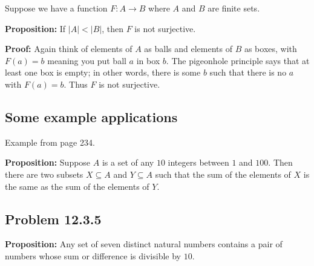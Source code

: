 \documentclass[
]{article}
\begin{document}
Suppose we have a function \(F:A\to B\) where \(A\) and \(B\) are finite
sets.

\textbf{Proposition:} If \(|A|<|B|\), then \(F\) is not surjective.

\textbf{Proof:} Again think of elements of \(A\) as balls and elements
of \(B\) as boxes, with \(F(a)=b\) meaning you put ball \(a\) in box
\(b\). The pigeonhole principle says that at least one box is empty; in
other words, there is some \(b\) such that there is no \(a\) with
\(F(a)=b\). Thus \(F\) is not surjective.

\vfill\eject

\hypertarget{some-example-applications}{%
\subsection{Some example applications}\label{some-example-applications}}

Example from page 234.

\textbf{Proposition:} Suppose \(A\) is a set of any \(10\) integers
between \(1\) and \(100\). Then there are two subsets \(X\subseteq A\)
and \(Y\subseteq A\) such that the sum of the elements of \(X\) is the
same as the sum of the elements of \(Y\).

\vfill\eject

\hypertarget{problem-12.3.5}{%
\subsection{Problem 12.3.5}\label{problem-12.3.5}}

\textbf{Proposition:} Any set of seven distinct natural numbers contains
a pair of numbers whose sum or difference is divisible by \(10\).
\end{document}
